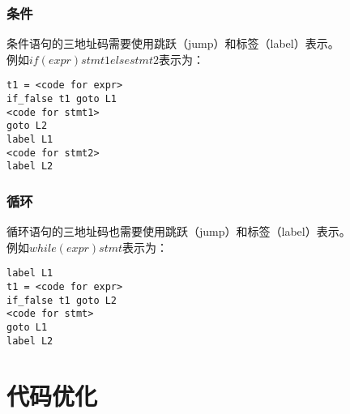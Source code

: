 \subsubsection{条件}

条件语句的三地址码需要使用跳跃（jump）和标签（label）表示。\\

例如$ if(expr) stmt1 else stmt2 $表示为：

\vspace{-0.5cm}

\begin{lstlisting}
t1 = <code for expr>
if_false t1 goto L1
<code for stmt1>
goto L2
label L1
<code for stmt2>
label L2
\end{lstlisting}

\vspace{0.5cm}

\subsubsection{循环}

循环语句的三地址码也需要使用跳跃（jump）和标签（label）表示。\\

例如$ while(expr) stmt $表示为：

\vspace{-0.5cm}

\begin{lstlisting}
label L1
t1 = <code for expr>
if_false t1 goto L2
<code for stmt>
goto L1
label L2
\end{lstlisting}

\newpage

\section{代码优化}

